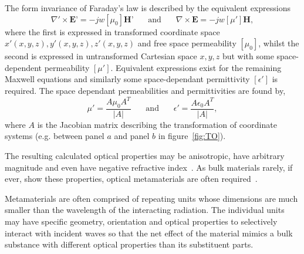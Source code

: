 \documentclass[11pt]{iopart}
\begin{document}
The form invariance of Faraday's law is
described by the equivalent expressions
\begin{equation}
  \label{ME1}
  \nabla'\times \textbf{E'} = -jw[\mu_0]\textbf{H'}
  ~~~~~~~~\text{and}~~~~~~~~
  \nabla\times \textbf{E} = -jw[\mu']\textbf{H},
\end{equation}
where the first is expressed in transformed coordinate space $x'(x, y,
z), y'(x, y, z), z'(x, y, z)$ and free space permeability $[\mu_0]$,
whilst the second is expressed in untransformed Cartesian space $x, y,
z$ but with some space-dependent permeability $[\mu']$.  Equivalent
expressions exist for the remaining Maxwell equations and similarly
some space-dependant permittivity $[\epsilon']$ is required. The space
dependant permeabilities and permittivities are found by,
\begin{equation}
  \label{eqn:J}
  \mu'=\frac{A\mu_0 A^T}{|A|}
  ~~~~~~~~\text{and}~~~~~~~~
  \epsilon'=\frac{A\epsilon_0 A^T}{|A|},
\end{equation}
where $A$ is the Jacobian matrix describing the transformation of
coordinate systems (e.g. between panel $a$ and panel $b$ in
figure~\ref{fig:TO}). 

The resulting calculated optical properties
may be anisotropic, have arbitrary magnitude and even have
negative refractive index~\cite{Pendry2000}. As bulk materials rarely, if ever, show these
properties, optical metamaterials are often
required~\cite{Smith2004}. 

Metamaterials are often comprised of
repeating units whose dimensions are much smaller than the wavelength
of the interacting radiation. The individual units may
have specific geometry, orientation and optical properties to
selectively interact with incident waves so that the net effect of the
material mimics a bulk substance with different optical properties
than its substituent parts.
\end{document}
